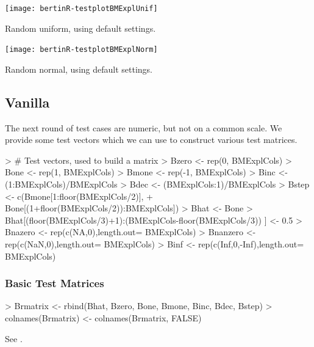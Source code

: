 \documentclass[nogin, dvips,12pt,a4paper,twoside]{amsart}
\begin{document}
\texttt{[image: bertinR-testplotBMExplUnif]}

Random uniform,  using default settings.

\texttt{[image: bertinR-testplotBMExplNorm]}

Random normal,  using default settings.

\clearpage

\subsection{Vanilla}

The next round of test cases are numeric, but not on a common scale. We provide some test vectors which we can use to construct various test matrices.

\begin{Schunk}
\begin{Sinput}
> # Test vectors, used to build a matrix
> Bzero <- rep(0, BMExplCols)
> Bone <- rep(1, BMExplCols)
> Bmone <- rep(-1, BMExplCols)
> Binc <- (1:BMExplCols)/BMExplCols
> Bdec <- (BMExplCols:1)/BMExplCols
> Bstep <- c(Bmone[1:floor(BMExplCols/2)], 
+ 	Bone[(1+floor(BMExplCols/2)):BMExplCols])
> Bhat <- Bone
> Bhat[(floor(BMExplCols/3)+1):(BMExplCols-floor(BMExplCols/3)) ] <- 0.5
> Bnazero <- rep(c(NA,0),length.out= BMExplCols)
> Bnanzero <- rep(c(NaN,0),length.out= BMExplCols)
> Binf <- rep(c(Inf,0,-Inf),length.out= BMExplCols)
\end{Sinput}
\end{Schunk}
\clearpage

\subsubsection{Basic Test Matrices}

\begin{Schunk}
\begin{Sinput}
> Brmatrix <- rbind(Bhat, Bzero, Bone, Bmone, Binc, Bdec, Bstep)
> colnames(Brmatrix) <- colnames(Brmatrix, FALSE)
\end{Sinput}
\end{Schunk}
See .
\end{document}
